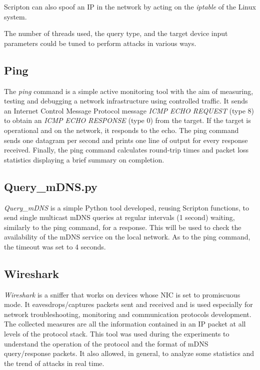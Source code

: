 \documentclass[fleqn, 11pt]{SelfArx} %
\begin{document}
Scripton can also spoof an IP in the network by acting on the \textit{iptable} of the Linux system.

The number of threads used, the query type, and the target device input parameters could be tuned to perform attacks in various ways.

\subsection{Ping}
The \textit {ping} \cite{pingManPage} command is a simple active monitoring tool with the aim of measuring, testing and debugging a network infrastructure using controlled traffic. It sends an Internet Control Message Protocol message \textit{ICMP ECHO REQUEST} (type 8) to obtain an \textit{ICMP ECHO RESPONSE} (type 0) from the target. If the target is operational and on the network, it responds to the echo. The ping command sends one datagram per second and prints one line of output for every response received. Finally, the ping command calculates round-trip times and packet loss statistics displaying a brief summary on completion.

\subsection{Query\_mDNS.py}
\label{sec:query-mdns-script}
\textit{Query\_mDNS} is a simple Python tool developed, reusing Scripton functions, to send single multicast mDNS queries at regular intervals (1 second) waiting, similarly to the ping command, for a response. This will be used to check the availability of the mDNS service on the local network.\newline
As to the ping command, the timeout was set to 4 seconds.

\subsection{Wireshark}
\textit{Wireshark} is a sniffer that works on devices whose NIC is set to promiscuous mode. It eavesdrops/captures packets sent and received and is used especially for network troubleshooting, monitoring and communication protocols development. The collected measures are all the information contained in an IP packet at all levels of the protocol stack. \newline
This tool was used during the experiments to understand the operation of the protocol and the format of mDNS query/response packets. \newline
It also allowed, in general, to analyze some statistics and the trend of attacks in real time.\newline
\end{document}
